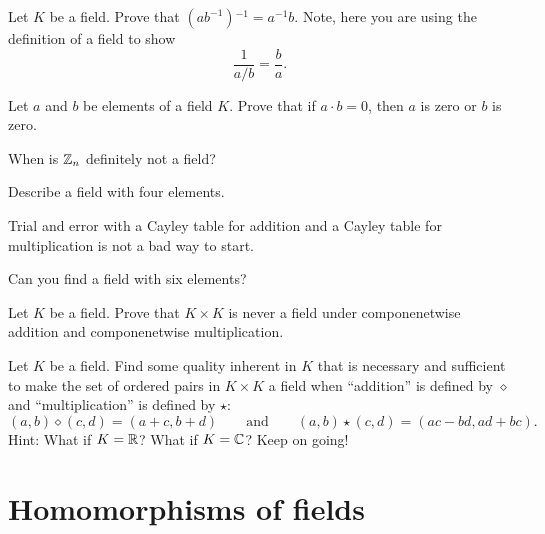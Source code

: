 \documentclass{ximera}
\begin{document}
\begin{exercise}
  Let $K$ be a field. Prove that ${\left(ab^{-1}\right)}\hspace{0pt}^{-1} = a^{-1}
  b$. Note, here you are using the definition of a field to show
  \[
  \frac{1}{a/b} = \frac{b}{a}.
  \]
\end{exercise}


\begin{exercise} 
  Let $a$ and $b$ be elements of a field $K$. Prove that if $a\cdot b
  = 0$, then $a$ is zero or $b$ is zero. 
\end{exercise}




\begin{exercise} 
  When is $\mathbb Z_n$ definitely not a field?
\end{exercise}

\begin{exercise}\label{E:FF4}
  Describe a field with four elements.
  \begin{hint}
    Trial and error with a Cayley table for addition and a Cayley
    table for multiplication is not a bad way to start.
  \end{hint}
\end{exercise}


\begin{exercise}\label{E:FF6} Can you find a field with six elements?
\end{exercise}


\begin{exercise}
  Let $K$ be a field. Prove that $K\times K$ is never a field under
  componenetwise addition and componenetwise multiplication.
\end{exercise}


\begin{exercise} 
Let $K$ be a field. Find some quality inherent in $K$ that is
necessary and sufficient to make the set of ordered pairs in $K\times
K$ a field when ``addition'' is defined by $\diamond$ and
``multiplication'' is defined by $\star$:
\[
(a,b)\diamond (c,d) = (a+c, b+d)\qquad\text{and}\qquad (a,b)\star (c,d) =
(ac-bd,ad+bc).
\]
Hint: What if $K = \mathbb R$? What if $K = \mathbb C$? Keep on going!
\end{exercise}



\section{Homomorphisms of fields}
\end{document}
